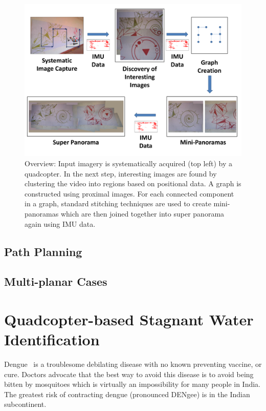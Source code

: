 \documentclass[11pt]{article}
\begin{document}
\begin{figure}[h!]
  \centering
  \includegraphics[width=\textwidth]{mosaicing/figures/Workflow} 
  \caption{ \label{fig:workflow} Overview: Input imagery is
    systematically acquired (top left) by a quadcopter.  In the next
    step, interesting images are found by clustering the video into
    regions based on positional data.  A graph is constructed using
    proximal images. For each connected component in a graph, standard
    stitching techniques are used to create mini-panoramas which are
    then joined together into super panorama 
    again using IMU data.}
\end{figure}
\subsection{Path Planning}
\subsection{Multi-planar Cases}

\section{Quadcopter-based Stagnant Water Identification}

Dengue~\cite{WHO15Dengue} is a troublesome debilating disease with no
known preventing vaccine, or cure. Doctors advocate that the best way
to avoid this disease is to avoid being bitten by mosquitoes which is
virtually an impossibility for many people in India.  The greatest
risk of contracting dengue (pronounced DENgee) is in the Indian
subcontinent.  
\end{document}
